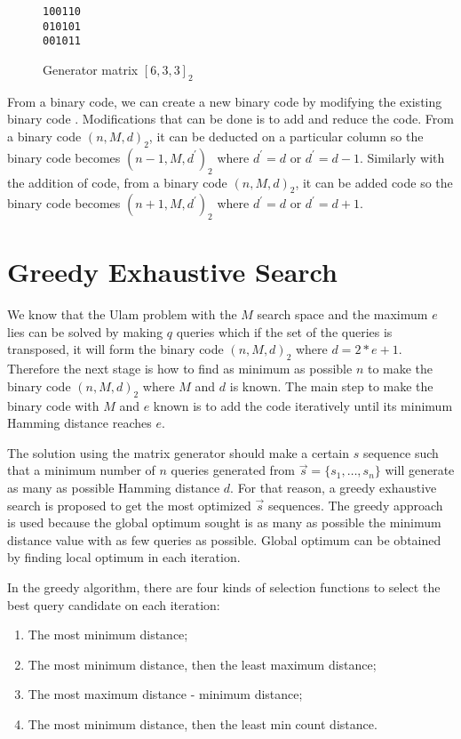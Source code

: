 \documentclass{TTP_DSL2006}
\renewcommand{\vec}{\overrightarrow}
\begin{document}
\begin{figure}
\centering
\begin{BVerbatim}
100110
010101
001011
\end{BVerbatim}
\caption{Generator matrix $[6,3,3]_2$}
\label{fig:generator633}
\end{figure}

From a binary code, we can create a new binary code by modifying the existing binary code \cite{Huffman}. Modifications that can be done is to add and reduce the code. From a binary code $(n,M,d)_2 $, it can be deducted on a particular column so the binary code becomes $(n-1,M,d^\prime) _2 $ where $d^\prime = d$ or $d^\prime = d-1$. Similarly with the addition of code, from a binary code $(n,M,d)_2$, it can be added code so the binary code becomes $(n+1,M,d^\prime)_2 $ where $d^\prime = d$ or $d^\prime = d+1$.

\section{Greedy Exhaustive Search}

We know that the Ulam problem with the $M$ search space and the maximum $e$ lies can be solved by making $q$ queries which if the set of the queries is transposed, it will form the binary code $(n,M,d) _2$ where $d=2*e+1$. Therefore the next stage is how to find as minimum as possible $n$ to make the binary code $(n,M,d)_2$ where $M$ and $d$ is known. The main step to make the binary code with $M$ and $e$ known is to add the code iteratively until its minimum Hamming distance reaches $e$.

The solution using the matrix generator should make a certain $s$ sequence such that a minimum number of $n$ queries generated from $\vec{s}= \{s_1,\ldots,s_n\}$ will generate as many as possible Hamming distance $d$. For that reason, a greedy exhaustive search is proposed to get the most optimized $\vec{s}$ sequences. The greedy approach is used because the global optimum sought is as many as possible the minimum distance value with as few queries as possible. Global optimum can be obtained by finding local optimum in each iteration.

In the greedy algorithm, there are four kinds of selection functions to select the best query candidate on each iteration:
\begin{enumerate}
  \item The most minimum distance;
  \item The most minimum distance, then the least maximum distance;
  \item The most {maximum distance - minimum distance};
  \item The most minimum distance, then the least min count distance.
\end{enumerate}
\end{document}
